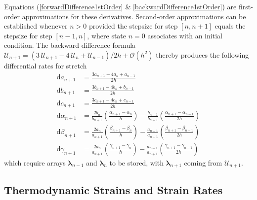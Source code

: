 Equations (\ref{forwardDifference1stOrder} \& \ref{backwardDifference1stOrder}) are first-order approximations for these derivatives.  Second-order approximations can be established whenever $n > 0$ provided the stepsize for step $[n, n+1]$ equals the stepsize for step $[n-1, n]$, where state $n=0$ associates with an initial condition.  The backward difference formula  $\dot{\boldsymbol{\mathcal{U}}}_{n+1} = ( 3 \, \boldsymbol{\mathcal{U}}_{n+1} -  4 \, \boldsymbol{\mathcal{U}}_{n} + \boldsymbol{\mathcal{U}}_{n-1} ) / 2h + \mathcal{O}(h^2)$ thereby produces the following differential rates for stretch
\begin{equation}
\begin{aligned}
\mathrm{d} a_{n+1} & = \frac {3a_{n+1} - 4a_{n} +  a_{n-1}}{2h} \\ 
\mathrm{d} b_{n+1} & = \frac {3b_{n+1} - 4b_{n} +  b_{n-1}}{2h} \\
\mathrm{d} c_{n+1} & = \frac {3c_{n+1} - 4c_{n} +  c_{n-1}}{2h} \\
\mathrm{d} \alpha_{n+1} & 
= \frac{2b_{n}} {b_{n+1}} \left( \frac{\alpha_{n+1} - \alpha_{n}}{h} \right) - \frac{b_{n-1}} {b_{n+1}} \left( \frac{\alpha_{n+1} - \alpha_{n-1}}{2h} \right) \\
\mathrm{d} \beta_{n+1} & 
= \frac{2a_{n}}{a_{n+1}} \left( \frac{\beta_{n+1} - \beta_{n} }{h} \right) - \frac{a_{n-1}} {a_{n+1}} \left( \frac{\beta_{n+1} - \beta_{n-1}}{2h} \right) \\ 
\mathrm{d} \gamma_{n+1} & 
= \frac{2a_{n}} {a_{n+1}} \left(\frac{\gamma_{n+1} - \gamma_{n}}{h} \right) - \frac{a_{n-1}}{a_{n+1}} \left( \frac{\gamma_{n+1} - \gamma_{n-1}}{2h} \right) 
\end{aligned}
\label{backwardDifference2ndOrder}
\end{equation}
which require arrays $\boldsymbol{\lambda}_{n-1}$ and $\boldsymbol{\lambda}_n$ to be stored, with $\boldsymbol{\lambda}_{n+1}$ coming from $\boldsymbol{\mathcal{U}}_{n+1}$.

\subsection{Thermodynamic Strains and Strain Rates}

